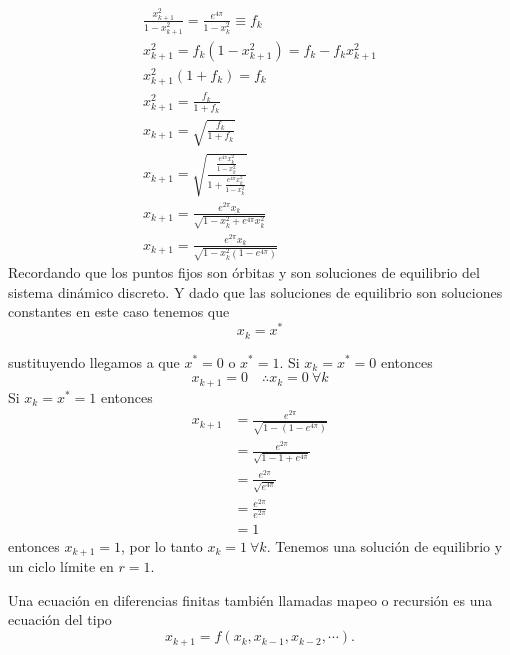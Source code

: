 \begin{ejemplo}
	\begin{gather*}
		\frac{x_{k+1}^2}{1-x_{k+1}^2} = \frac{e^{4\pi}}{1-x_{k}^2} \equiv f_k \\
		x_{k+1}^2 = f_k(1-x_{k+1}^2)=f_k-f_kx_{k+1}^2 \\
		x_{k+1}^2(1+f_k)=f_k \\
	  x_{k+1}^2 = \frac{f_k}{1+f_k} \\
		x_{k+1} = \sqrt{\frac{f_k}{1+f_k}}  \\
		x_{k+1} = \sqrt{\frac{\frac{e^{4\pi}x^2_k}{1-x_k^2}}{1 + \frac{e^{4\pi}x_k^2}{1-x_k^2}}} \\
		x_{k+1} = \frac{e^{2\pi}x_k}{\sqrt{1-x_k^2+e^{4\pi}x_k^2}} \\
		x_{k+1} = \frac{e^{2\pi}x_k}{\sqrt{1-x_k^2(1-e^{4\pi})}}
	\end{gather*}
	Recordando que los puntos fijos son órbitas y son soluciones de equilibrio del sistema dinámico discreto. Y dado que las soluciones de equilibrio son soluciones constantes en este caso tenemos que
	\begin{equation*}
	  x_k = x^* 
	\end{equation*}

	sustituyendo llegamos a que $x^*=0$ o $x^*=1$. Si $x_k = x^*=0$ entonces
	\begin{equation*}
	   x_{k+1} = 0 \quad \therefore x_k=0 \ \forall k
	\end{equation*}
	Si  $x_k=x^*=1$ entonces
	\begin{align*}
		x_{k+1} &= \frac{e^{2\pi}}{\sqrt{1-(1-e^{4\pi})}} \\
						&= \frac{e^{2\pi}}{\sqrt{1-1+e^{4\pi}}} \\
						&= \frac{e^{2\pi}}{\sqrt{e^{4\pi}}} \\
						&= \frac{e^{2\pi}}{e^{2\pi}} \\
						&= 1
	\end{align*}
	entonces $x_{k+1}=1$, por lo tanto $x_k=1 \ \forall k$. Tenemos una solución de equilibrio y un ciclo límite en $r=1$. 

\end{ejemplo}
	 \begin{tcolorbox}[colback=Black!4, colframe=White,arc=2mm]
	 \begin{definicion}
	 	Una ecuación en diferencias finitas también llamadas mapeo o recursión es una ecuación del tipo
		\begin{equation*}
		  x_{k+1} = f(x_k, x_{k-1}, x_{k-2}, \cdots). 
		\end{equation*}
	 \end{definicion}
	 \end{tcolorbox}
